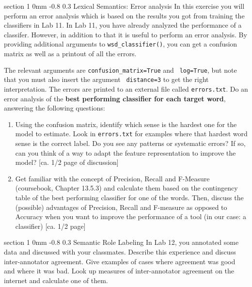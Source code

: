 \documentclass[11pt]{article}
\makeatletter
\newcommand{\newsec}[1]{\section{#1}\noindent}
\renewcommand{\section}{\@startsection
{section}%
{1}%
{0mm}%
{-0.8\baselineskip}%
{0.3\baselineskip}%
{\bfseries\large}}%
\makeatother
\begin{document}
\newsec{Lexical Semantics: Error analysis}%
In this exercise you will perform an error analysis which is based on
the results you got from training the classifiers in Lab 11.  In Lab
11, you have already analyzed the performance of a classifer. However,
in addition to that it is useful to perform an error analysis. By
providing additional arguments to {\tt wsd\_classifier()}, you can get
a confusion matrix as well as a printout of all the errors.
\begin{center}
\fbox{
\scalebox{0.55}{

}}
\end{center}
The relevant arguments are {\tt confusion\_matrix=True} and {\tt
  log=True}, but note that you must also insert the argument {\tt
  distance=3} to get the right interpretation. The errors are printed
to an external file called {\tt errors.txt}. Do an error analysis of
the \textbf{best performing classifier for each target word}, answering the
following questions:
\begin{enumerate}
\item Using the confusion matrix, identify which sense is the hardest
  one for the model to estimate. Look in {\tt errors.txt} for examples
  where that hardest word sense is the correct label.  Do you see any
  patterns or systematic errors? If so, can you think of a way to
  adapt the feature representation to improve the model?
  \textcolor{UUred}{[ca. 1/2 page of discussion]}
\item Get familiar with the concept of Precision, Recall and F-Measure (coursebook, Chapter 13.5.3) and calculate them based on the contingency table of the best performing classifier for one of the words. Then, discuss the (possible) advantages of Precision, Recall and F-measure as opposed to Accuracy when you want to improve the performance of a tool (in our case: a classifier) \textcolor{UUred}{[ca. 1/2 page]}
\end{enumerate}


\newsec{Semantic Role Labeling}%
In Lab 12, you annotated some data and discussed with your classmates.
Describe this experience and discuss inter-annotator agreement.
Give examples of cases where agreement was good and where it was bad.
Look up measures of inter-annotator agreement on the internet and calculate one of them.
\end{document}
